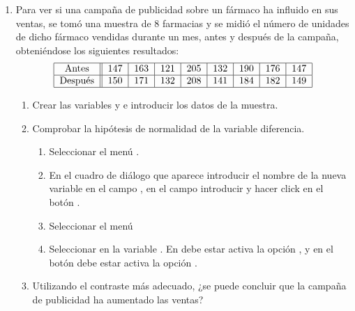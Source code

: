 \begin{description}
\begin{enumerate}[leftmargin=*]
\item  Para ver si una campaña de publicidad sobre un
 fármaco ha influido en sus ventas, se tomó una muestra de
 8 farmacias y se midió el número de unidades de dicho
 fármaco vendidas durante un mes, antes y después de la
 campaña, obteniéndose los siguientes resultados:
\[
\begin{tabular}{|c||c|c|c|c|c|c|c|c|}
\hline Antes & 147 & 163 & 121 & 205 & 132 & 190 & 176 & 147 \\
\hline Después & 150 & 171 & 132 & 208 & 141 & 184 & 182 & 149
\\
\hline
\end{tabular}
\]

\begin{enumerate}
\item Crear las variables  y  e
 introducir los datos de la muestra.

\item Comprobar la hipótesis de normalidad de la variable diferencia.

\begin{indicacion}
\begin{enumerate}
\item Seleccionar el menú .
\item En el cuadro de diálogo que aparece introducir el nombre de la nueva variable  en el campo , en el campo  introducir  y hacer click en el botón .
\item Seleccionar el menú 
\item Seleccionar en  la variable . En  debe estar activa la opción , y en el botón  debe estar activa la opción .
\end{enumerate}
\end{indicacion}

\item Utilizando el contraste más adecuado, ¿se puede concluir que la campaña de publicidad ha aumentado las ventas?


\end{enumerate}
\end{enumerate}
\end{description}
